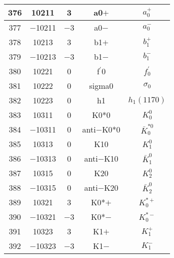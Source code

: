\documentclass{article}
\begin{document}
\begin{table}[!htbp]
\begin{tabular}{|c|c|c|c|c|}
\hline
376 & 10211 & 3 & a\underline{\hspace{0.6em}}0$+$ & $a_{0}^{+}$ \\
\hline
377 & $-$10211 & $-$3 & a\underline{\hspace{0.6em}}0$-$ & $a_{0}^{-}$ \\
\hline
378 & 10213 & 3 & b\underline{\hspace{0.6em}}1$+$ & $b_{1}^{+}$ \\
\hline
379 & $-$10213 & $-$3 & b\underline{\hspace{0.6em}}1$-$ & $b_{1}^{-}$ \\
\hline
380 & 10221 & 0 & f$^{\prime}$\underline{\hspace{0.6em}}0 & $f_{0}^{\prime}$ \\
\hline
381 & 10222 & 0 & sigma\underline{\hspace{0.6em}}0 & $\sigma_{0}$ \\
\hline
382 & 10223 & 0 & h\underline{\hspace{0.6em}}1 & $h_{1}(1170)$ \\
\hline
383 & 10311 & 0 & K\underline{\hspace{0.6em}}0*0 & $K_0^{0}$ \\
\hline
384 & $-$10311 & 0 & anti$-$K\underline{\hspace{0.6em}}0*0 & $\bar{K}_0^{*0}$ \\
\hline
385 & 10313 & 0 & K\underline{\hspace{0.6em}}10 & $K_1^{0}$ \\
\hline
386 & $-$10313 & 0 & anti$-$K\underline{\hspace{0.6em}}10 & $\bar{K}_1^{0}$ \\
\hline
387 & 10315 & 0 & K\underline{\hspace{0.6em}}20 & $K_2^0$ \\
\hline
388 & $-$10315 & 0 & anti$-$K\underline{\hspace{0.6em}}20 & $\bar{K}_2^0$ \\
\hline
389 & 10321 & 3 & K\underline{\hspace{0.6em}}0*$+$ & $K_{0}^{*+}$ \\
\hline
390 & $-$10321 & $-$3 & K\underline{\hspace{0.6em}}0*$-$ & $K_{0}^{*-}$ \\
\hline
391 & 10323 & 3 & K\underline{\hspace{0.6em}}1$+$ & $K_1^{+}$ \\
\hline
392 & $-$10323 & $-$3 & K\underline{\hspace{0.6em}}1$-$ & $K_{1}^{-}$ \\

\end{tabular}
\end{table}
\end{document}
